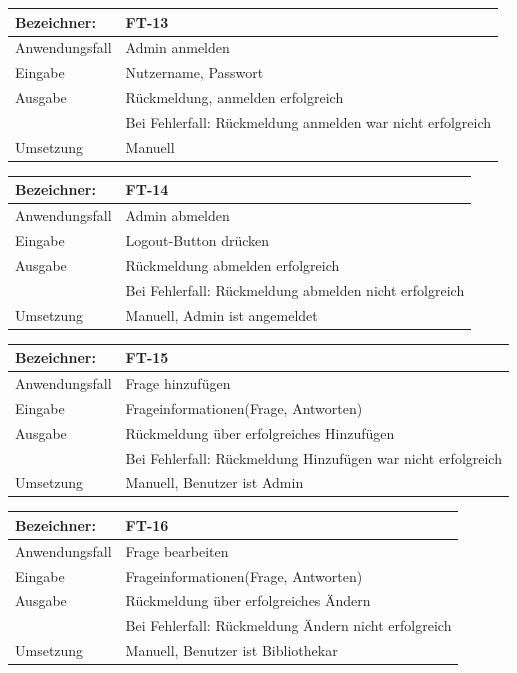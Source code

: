 \documentclass[fontsize=12pt,paper=a4,twoside]{scrartcl}
\begin{document}
\begin{tabular}{|l|p{13.75cm}|}
\hline
	Bezeichner: & FT-13\\
\hline
	Anwendungsfall & Admin anmelden\\
\hline
	Eingabe & Nutzername, Passwort\\
\hline
	Ausgabe & Rückmeldung, anmelden erfolgreich\\ &
	Bei Fehlerfall: Rückmeldung anmelden war nicht erfolgreich\\
\hline
	Umsetzung & Manuell\\
\hline
\end{tabular}

\begin{tabular}{|l|p{13.75cm}|}
\hline
	Bezeichner: & FT-14\\
\hline
	Anwendungsfall & Admin abmelden\\
\hline
	Eingabe & Logout-Button drücken\\
\hline
	Ausgabe & Rückmeldung abmelden erfolgreich\\ &
	Bei Fehlerfall: Rückmeldung abmelden nicht erfolgreich\\
\hline
	Umsetzung & Manuell, Admin ist angemeldet\\
\hline
\end{tabular}

\begin{tabular}{|l|p{13.75cm}|}
\hline
	Bezeichner: & FT-15\\
\hline
	Anwendungsfall & Frage hinzufügen\\
\hline
	Eingabe & Frageinformationen(Frage, Antworten)\\
\hline
	Ausgabe & Rückmeldung über erfolgreiches Hinzufügen\\ &
	Bei Fehlerfall: Rückmeldung Hinzufügen war nicht erfolgreich\\
\hline
	Umsetzung & Manuell, Benutzer ist Admin\\
\hline
\end{tabular}

\begin{tabular}{|l|p{13.75cm}|}
\hline
	Bezeichner: & FT-16\\
\hline
	Anwendungsfall & Frage bearbeiten\\
\hline
	Eingabe & Frageinformationen(Frage, Antworten)\\
\hline
	Ausgabe & Rückmeldung über erfolgreiches Ändern\\ &
	Bei Fehlerfall: Rückmeldung Ändern nicht erfolgreich\\
\hline
	Umsetzung & Manuell, Benutzer ist Bibliothekar\\
\hline
\end{tabular}
\end{document}
